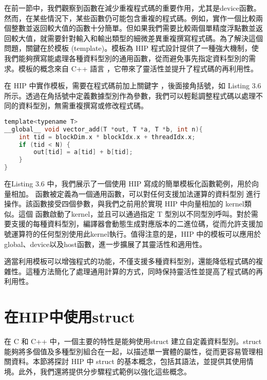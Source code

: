 在前一節中，我們觀察到函數在減少重複程式碼的重要作用，尤其是device函數。然而，在某些情況下，某些函數仍可能包含重複的程式碼。例如，實作一個比較兩個整數並返回較大值的函數十分簡單。但如果我們需要比較兩個單精度浮點數並返回較大值，就需要針對輸入和輸出類型的細微差異重複撰寫程式碼。為了解決這個問題，關鍵在於模板 (template)。模板為 HIP 程式設計提供了一種強大機制，使我們能夠撰寫能處理各種資料型別的通用函數，從而避免事先指定資料型別的需求。模板的概念來自 C++ 語言 \cite{stroustrup2013cpp}，它帶來了靈活性並提升了程式碼的再利用性。

在 HIP 中實作模板，需要在程式碼前加上關鍵字 ，後面接角括號，如 Listing 3.6 所示。透過在角括號中定義數據型別作為參數，我們可以輕鬆調整程式碼以處理不同的資料型別，無需重複撰寫或修改程式碼。

\begin{lstlisting}[language=C, caption={在HIP kernel中使用模板}, label={6th:example}]
template<typename T>
__global__ void vector_add(T *out, T *a, T *b, int n){
    int tid = blockDim.x * blockIdx.x + threadIdx.x;
    if (tid < N) {
        out[tid] = a[tid] + b[tid];
    }
}
\end{lstlisting}

在Listing 3.6 中，我們展示了一個使用 HIP 寫成的簡單模板化函數範例，用於向量相加。 函數被定義為一個通用函數，可以對任何支援加法運算的資料型別  進行操作。該函數接受四個參數，與我們之前用於實現 HIP 中向量相加的  kernel類似。這個  函數啟動了kernel，並且可以通過指定 T 型別以不同型別呼叫。對於需要支援的每種資料型別，編譯器會動態生成對應版本的二進位碼，從而允許支援加號運算符的任何型別使用此kernel執行。值得注意的是，HIP 中的模板可以應用於global、device以及host函數，進一步擴展了其靈活性和適用性。

適當利用模板可以增強程式的功能，不僅支援多種資料型別，還能降低程式碼的複雜性。這種方法簡化了處理通用計算的方式，同時保持靈活性並提高了程式碼的再利用性。

\section{在HIP中使用struct}

在 C 和 C++ 中，一個主要的特性是能夠使用struct 建立自定義資料型別。struct 能夠將多個值及多種型別組合在一起，以描述單一實體的屬性，從而更容易管理相關資料。本節將探討 HIP 中 struct 的基本概念，包括其語法，並提供其使用情境。此外，我們還將提供分步驟程式範例以強化這些概念。

